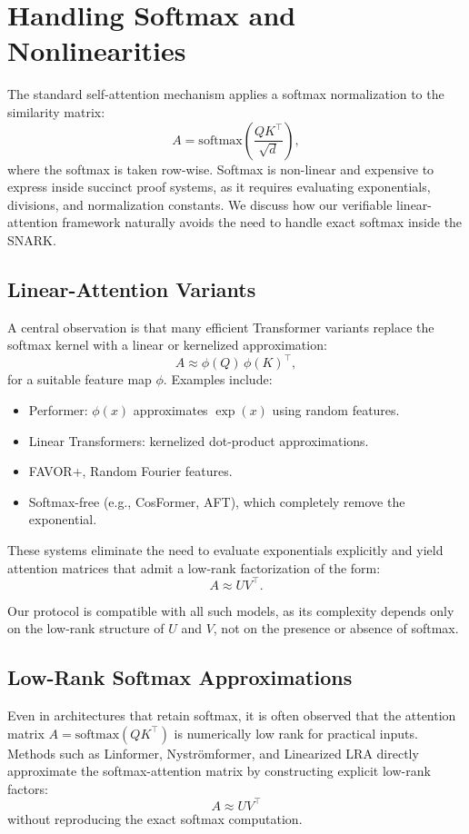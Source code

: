 \documentclass[11pt]{article}
\begin{document}
\section{Handling Softmax and Nonlinearities}

The standard self-attention mechanism applies a softmax normalization
to the similarity matrix:
\[
  A = \mathrm{softmax}\!\left(\frac{QK^\top}{\sqrt{d}}\right),
\]
where the softmax is taken row-wise.  
Softmax is non-linear and expensive to express inside succinct proof
systems, as it requires evaluating exponentials, divisions, and
normalization constants.  
We discuss how our verifiable linear-attention framework naturally
avoids the need to handle exact softmax inside the SNARK.

\subsection{Linear-Attention Variants}

A central observation is that many efficient Transformer variants
replace the softmax kernel with a linear or kernelized approximation:
\[
  A \approx \phi(Q)\, \phi(K)^\top,
\]
for a suitable feature map $\phi$.
Examples include:

\begin{itemize}
  \item Performer: $\phi(x)$ approximates $\exp(x)$ using random features.
  \item Linear Transformers: kernelized dot-product approximations.
  \item FAVOR+, Random Fourier features.
  \item Softmax-free (e.g., CosFormer, AFT), which completely remove 
        the exponential.
\end{itemize}

These systems eliminate the need to evaluate exponentials explicitly and
yield attention matrices that admit a low-rank factorization of the
form:
\[
  A \approx U V^\top.
\]

Our protocol is compatible with all such models, as its complexity
depends only on the low-rank structure of $U$ and $V$, not on the
presence or absence of softmax.

\subsection{Low-Rank Softmax Approximations}

Even in architectures that retain softmax, it is often observed that the
attention matrix $A = \mathrm{softmax}(QK^\top)$ is numerically low rank
for practical inputs.  
Methods such as Linformer, Nyströmformer, and Linearized LRA directly
approximate the softmax-attention matrix by constructing explicit
low-rank factors:
\[
  A \approx U V^\top
\]
without reproducing the exact softmax computation.
\end{document}
